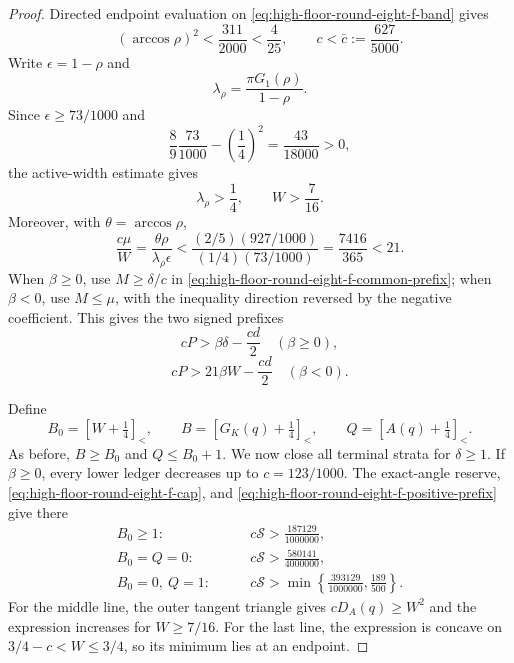 \documentclass[11pt]{article}
\theoremstyle{remark}
\newcommand{\sbr}[1]{[#1]_{<}}
\begin{document}
\begin{proof}
Directed endpoint evaluation on \eqref{eq:high-floor-round-eight-f-band}
gives
\begin{equation}
 (\arccos\rho)^2<\frac{311}{2000}<\frac4{25},
 \qquad c<\bar c:=\frac{627}{5000}.
 \label{eq:high-floor-round-eight-f-ratio}
\end{equation}
Write $\epsilon=1-\rho$ and
\[
 \lambda_\rho=\frac{\pi G_1(\rho)}{1-\rho}.
\]
Since $\epsilon\geq73/1000$ and
\[
 \frac89\frac{73}{1000}-\left(\frac14\right)^2
 =\frac{43}{18000}>0,
\]
the active-width estimate gives
\begin{equation}
 \lambda_\rho>\frac14,\qquad W>\frac7{16}.
 \label{eq:high-floor-round-eight-f-width}
\end{equation}
Moreover, with $\theta=\arccos\rho$,
\begin{equation}
 \frac{c\mu}{W}
 =\frac{\theta\rho}{\lambda_\rho\epsilon}
 <\frac{(2/5)(927/1000)}{(1/4)(73/1000)}
 =\frac{7416}{365}<21.
 \label{eq:high-floor-round-eight-f-radial-ratio}
\end{equation}
When $\beta\geq0$, use $M\geq\delta/c$ in
\eqref{eq:high-floor-round-eight-f-common-prefix}; when $\beta<0$, use
$M\leq\mu$, with the inequality direction reversed by the negative
coefficient.  This gives the two signed prefixes
\begin{equation}
 \boxed{cP>\beta\delta-\frac{cd}{2}}
 \quad(\beta\geq0),
 \label{eq:high-floor-round-eight-f-positive-prefix}
\end{equation}
\begin{equation}
 \boxed{cP>21\beta W-\frac{cd}{2}}
 \quad(\beta<0).
 \label{eq:high-floor-round-eight-f-negative-prefix}
\end{equation}

Define
\[
 B_0=\sbr{W+\tfrac14},\qquad
 B=\sbr{G_K(q)+\tfrac14},\qquad
 Q=\sbr{A(q)+\tfrac14}.
\]
As before, $B\geq B_0$ and $Q\leq B_0+1$.  We now close all terminal
strata for $\delta\geq1$.  If $\beta\geq0$, every lower ledger decreases
up to $c=123/1000$.  The exact-angle reserve,
\eqref{eq:high-floor-round-eight-f-cap}, and
\eqref{eq:high-floor-round-eight-f-positive-prefix} give there
\begin{equation}
 \begin{aligned}
 B_0\geq1:&\qquad
 c\mathcal S>\frac{187129}{1000000},\\
 B_0=Q=0:&\qquad
 c\mathcal S>\frac{580141}{4000000},\\
 B_0=0,\ Q=1:&\qquad
 c\mathcal S>
 \min\left\{\frac{393129}{1000000},\frac{189}{500}\right\}.
 \end{aligned}
 \label{eq:high-floor-round-eight-f-positive-ledgers}
\end{equation}
For the middle line, the outer tangent triangle gives
$cD_A(q)\geq W^2$ and the expression increases for $W\geq7/16$.
For the last line, the expression is concave on
$3/4-c<W\leq3/4$, so its minimum lies at an endpoint.


\end{proof}
\end{document}
